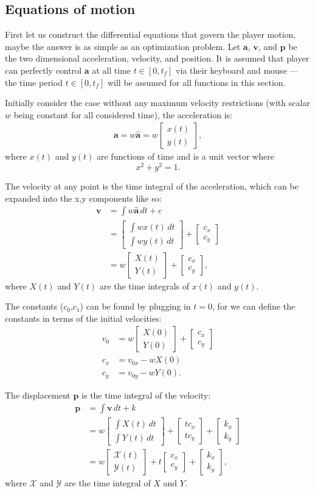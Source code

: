 \documentclass[a4paper,11pt]{article}
\newcommand{\tvec}[1]{\boldsymbol{#1}}
\newcommand{\tunit}[1]{\boldsymbol{\hat{#1}}}
\newcommand{\ta}{\tvec{a}}
\newcommand{\tv}{\tvec{v}}
\newcommand{\tp}{\tvec{p}}
\newcommand{\tpar}[2]{\begin{bmatrix}#1\\#2 \end{bmatrix}}
\newcommand{\tfx}{\mathcal{X}}
\newcommand{\tfy}{\mathcal{Y}}
\begin{document}
\subsection{Equations of motion}
First let us construct the differential equations that govern the player motion, maybe the answer is as simple as an optimization problem. Let $\ta$, $\tv$, and $\tp$ be the two dimensional acceleration, velocity, and position. It is assumed that player can perfectly control $\ta$ at all time $t \in [0, t_f]$ via their keyboard and mouse --- the time period $t\in[0,t_f]$ will be assumed for all functions in this section.

Initially consider the case without any maximum velocity restrictions (with scalar $w$ being constant for all considered time), the acceleration is:
\begin{align*}
 \ta = w\tunit{a} = w\tpar{x(t)}{y(t)},
\end{align*}
where $x(t)$ and $y(t)$ are functions of time and is a unit vector where
\[
    x^2 + y^2 = 1.
\]

The velocity at any point is the time integral of the acceleration, which can be expanded into the x,y components like so:
\begin{align*}
    \tv &= \int w\tunit{a} \,dt + c\\
    &= \tpar{\int w x(t) \,dt}{ \int w y(t) \,dt} + \tpar{c_x}{c_y}\\
    &= w\tpar{X(t)}{Y(t)} + \tpar{c_x}{c_y},
\end{align*}
where $X(t)$ and $Y(t)$ are the time integrals of $x(t)$ and $y(t)$.

The constants ($c_0$,$c_1$) can be found by plugging in $t=0$, for we can define the constants in terms of the initial velocities:
\begin{align*}
    v_0 &= w \tpar{X(0)}{Y(0)} + \tpar{c_x}{c_y}\\
    c_x &= v_{0x} -wX(0)\\
    c_y &= v_{0y} -wY(0).
\end{align*}

The displacement $\tp$ is the time integral of the velocity:
\begin{align*}
    \tp &= \int \tv \, dt + k\\
    &= w \tpar{\int X(t) \, dt}{\int Y(t) \, dt} + \tpar{tc_x}{tc_y} + \tpar{k_x}{k_y}\\
    &= w \tpar {\tfx(t)}{\tfy(t)}  + t\tpar{c_x}{c_y}  + \tpar{k_x}{k_y},
\end{align*}
where $\tfx$ and $\tfy$ are the time integral of $X$ and $Y$.
\end{document}
